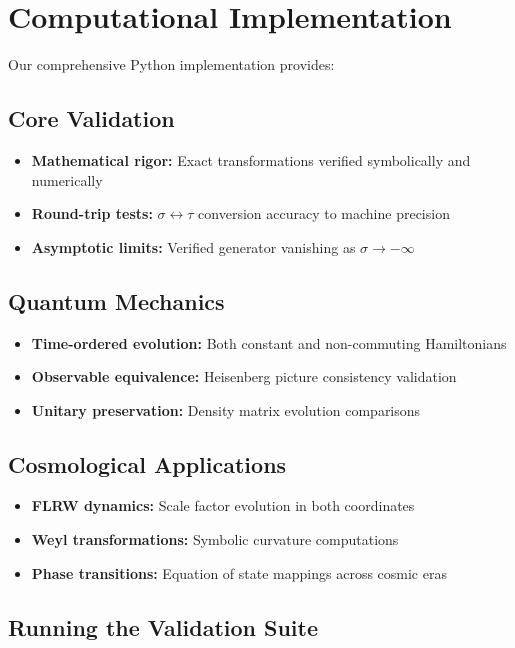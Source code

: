 \documentclass[11pt]{article}
\begin{document}
\section{Computational Implementation}

Our comprehensive Python implementation provides:

\subsection{Core Validation}
\begin{itemize}
\item \textbf{Mathematical rigor:} Exact transformations verified symbolically and numerically
\item \textbf{Round-trip tests:} $\sigma \leftrightarrow \tau$ conversion accuracy to machine precision
\item \textbf{Asymptotic limits:} Verified generator vanishing as $\sigma \to -\infty$
\end{itemize}

\subsection{Quantum Mechanics}
\begin{itemize}
\item \textbf{Time-ordered evolution:} Both constant and non-commuting Hamiltonians
\item \textbf{Observable equivalence:} Heisenberg picture consistency validation
\item \textbf{Unitary preservation:} Density matrix evolution comparisons
\end{itemize}

\subsection{Cosmological Applications}
\begin{itemize}
\item \textbf{FLRW dynamics:} Scale factor evolution in both coordinates
\item \textbf{Weyl transformations:} Symbolic curvature computations
\item \textbf{Phase transitions:} Equation of state mappings across cosmic eras
\end{itemize}

\subsection{Running the Validation Suite}
\end{document}
